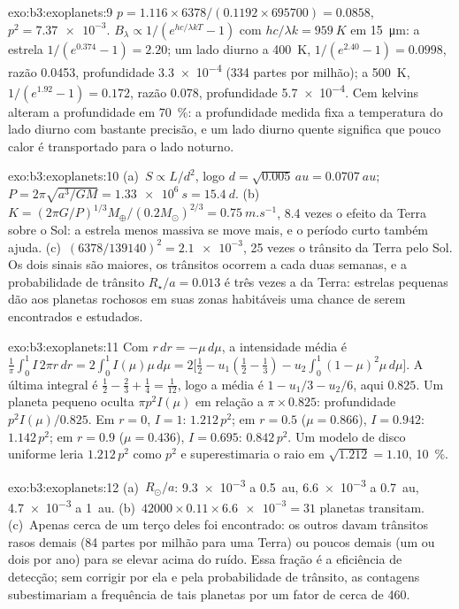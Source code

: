 \begin{solution}{exo:b3:exoplanets:9}
$p = 1.116\times6378/(0.1192\times695700) = 0.0858$, $p^2 = \num{7.37e-3}$.
$B_\lambda \propto 1/(e^{hc/\lambda kT} - 1)$ com $hc/\lambda k =
\qty{959}{K}$ em \qty{15}{\micro m}: a estrela $1/(e^{0.374} - 1) = 2.20$;
um lado diurno a \qty{400}{K}, $1/(e^{2.40} - 1) = 0.0998$, razão \num{0.0453},
profundidade \num{3.3e-4} (334 partes por milhão); a \qty{500}{K}, $1/(e^{1.92} -
1) = 0.172$, razão \num{0.078}, profundidade \num{5.7e-4}. Cem kelvins
alteram a profundidade em \qty{70}{\percent}: a profundidade medida fixa a
temperatura do lado diurno com bastante precisão, e um lado diurno quente significa que pouco calor
é transportado para o lado noturno.
\end{solution}

\begin{solution}{exo:b3:exoplanets:10}
(a)~$S \propto L/d^2$, logo $d = \sqrt{0.005}\,\unit{au} = \qty{0.0707}{au}$;
$P = 2\pi\sqrt{a^3/GM} = \qty{1.33e6}{s} = \qty{15.4}{d}$.
(b)~$K = (2\pi G/P)^{1/3}M_\oplus/(0.2M_\odot)^{2/3} = \qty{0.75}{m.s^{-1}}$,
8.4 vezes o efeito da Terra sobre o Sol: a estrela menos massiva se move mais, e
o período curto também ajuda. (c)~$(6378/139140)^2 = \num{2.1e-3}$, 25 vezes
o trânsito da Terra pelo Sol. Os dois sinais são maiores, os trânsitos
ocorrem a cada duas semanas, e a probabilidade de trânsito $R_\star/a =
\num{0.013}$ é três vezes a da Terra: estrelas pequenas dão aos planetas rochosos em
suas zonas habitáveis uma chance de serem encontrados e estudados.
\end{solution}

\begin{solution}{exo:b3:exoplanets:11}
Com $r\,dr = -\mu\,d\mu$, a intensidade média é $\frac1\pi\int_0^1
I\,2\pi r\,dr = 2\int_0^1 I(\mu)\mu\,d\mu = 2\bigl[\tfrac12 - u_1(\tfrac12 -
\tfrac13) - u_2\int_0^1(1 - \mu)^2\mu\,d\mu\bigr]$. A última integral é
$\tfrac12 - \tfrac23 + \tfrac14 = \tfrac1{12}$, logo a média é $1 - u_1/3 -
u_2/6$, aqui $0.825$. Um planeta pequeno oculta $\pi p^2 I(\mu)$ em relação a $\pi\times
0.825$: profundidade $p^2 I(\mu)/0.825$. Em $r = 0$, $I = 1$: $1.212\,p^2$; em
$r = 0.5$ ($\mu = 0.866$), $I = 0.942$: $1.142\,p^2$; em $r = 0.9$ ($\mu =
0.436$), $I = 0.695$: $0.842\,p^2$. Um modelo de disco uniforme leria
$1.212\,p^2$ como $p^2$ e superestimaria o raio em $\sqrt{1.212} = 1.10$,
\qty{10}{\percent}.
\end{solution}

\begin{solution}{exo:b3:exoplanets:12}
(a)~$R_\odot/a$: \num{9.3e-3} a \qty{0.5}{au}, \num{6.6e-3} a
\qty{0.7}{au}, \num{4.7e-3} a \qty{1}{au}. (b)~$42000\times0.11\times
\num{6.6e-3} = 31$ planetas transitam. (c)~Apenas cerca de um terço deles foi
encontrado: os outros davam trânsitos rasos demais (84 partes por milhão para
uma Terra) ou poucos demais (um ou dois por ano) para se elevar acima do ruído. Essa
fração é a eficiência de detecção; sem corrigir por ela e pela
probabilidade de trânsito, as contagens subestimariam a frequência de tais
planetas por um fator de cerca de 460.
\end{solution}

